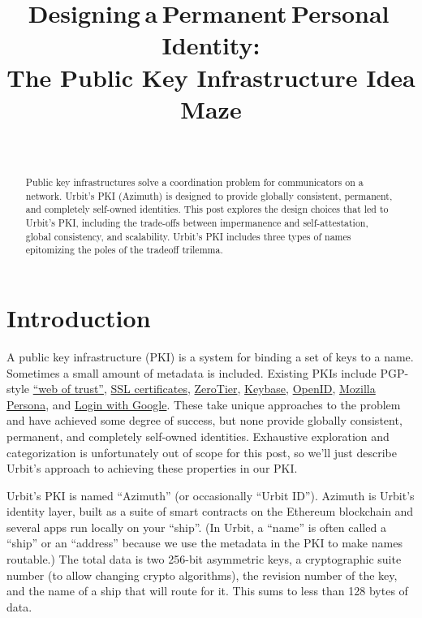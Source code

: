 \documentclass[twoside]{article}
\title{Designing a Permanent Personal Identity: \\ The Public Key Infrastructure Idea Maze}
\author{\authorname~\authorpatp \\ \affiliation}
\date{}
\begin{document}
\maketitle
\thispagestyle{firststyle}

\begin{abstract}
Public key infrastructures solve a coordination problem for communicators on a network. Urbit's PKI (Azimuth) is designed to provide globally consistent, permanent, and completely self-owned identities. This post explores the design choices that led to Urbit's PKI, including the trade-offs between impermanence and self-attestation, global consistency, and scalability. Urbit's PKI includes three types of names epitomizing the poles of the tradeoff trilemma.
\end{abstract}

\setcounter{page}{1}

\tableofcontents

\section{Introduction}

A public key infrastructure (PKI) is a system for binding a set of keys to a name. Sometimes a small amount of metadata is included. Existing PKIs include PGP-style
\href{https://en.wikipedia.org/wiki/Web_of_trust}{``web of trust''},
\href{https://en.wikipedia.org/wiki/Certificate_authority}{SSL
certificates},
\href{https://www.zerotier.com/lf-announcement/}{ZeroTier},
\href{https://keybase.io/}{Keybase},
\href{https://openid.net/what-is-openid/}{OpenID},
\href{https://developer.mozilla.org/en-US/docs/Archive/Mozilla/Persona}{Mozilla
Persona}, and \href{https://developers.google.com/identity}{Login with
Google}. These take unique approaches to the problem and have achieved
some degree of success, but none provide globally consistent, permanent,
and completely self-owned identities. Exhaustive exploration and
categorization is unfortunately out of scope for this post, so we'll
just describe Urbit's approach to achieving these properties in our PKI.

Urbit's PKI is named ``Azimuth'' (or occasionally ``Urbit ID'').  Azimuth is Urbit's identity layer, built as a suite of smart contracts on the Ethereum blockchain and several apps run locally on your ``ship''. (In Urbit, a ``name'' is often called a ``ship'' or an ``address''
because we use the metadata in the PKI to make names routable.) The total
data is two 256-bit asymmetric keys, a cryptographic suite number (to
allow changing crypto algorithms), the revision number of the key, and
the name of a ship that will route for it. This sums to less than 128
bytes of data.
\end{document}
